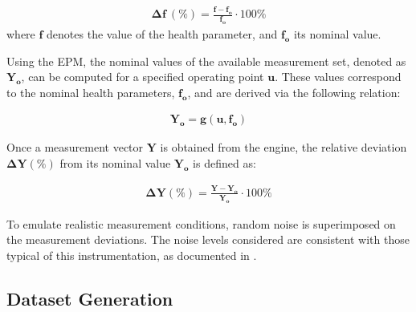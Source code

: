 \documentclass[twocolumn]{ceurart}
\begin{document}
\begin{eqnarray}\label{eq:deltaf}
    \mathbf{\Delta f}\ (\%) = \frac{\mathbf{f} - \mathbf{f_o}}{\mathbf{f_o}} \cdot 100\%
\end{eqnarray}
%
where $\mathbf{f}$ denotes the value of the health parameter, and $\mathbf{f_o}$ its nominal value.

Using the EPM, the nominal values of the available measurement set, denoted as $\mathbf{Y_o}$, 
can be computed for a specified operating point $\mathbf{u}$. These values correspond to the nominal health parameters, $\mathbf{f_o}$, and are derived via the following relation:

\begin{eqnarray}\label{eq:epmnom}
\mathbf{Y_o} = \mathbf{g}(\mathbf{u}, \mathbf{f_o})
\end{eqnarray}

Once a measurement vector $\mathbf{Y}$ is obtained from the engine, the relative deviation $\mathbf{\Delta Y(\%)}$
from its nominal value $\mathbf{Y_o}$ is defined as:

\begin{eqnarray}\label{eq:deltay}
    \mathbf{\Delta Y}(\%) = \frac{\mathbf{Y} - \mathbf{Y_o}}{\mathbf{Y_o}} \cdot 100\%
\end{eqnarray}

To emulate realistic measurement conditions, random noise is superimposed on the measurement 
deviations. The noise levels considered are consistent with those typical of this instrumentation, 
as documented in \citep{romesis_model-assisted_2024}.

\subsection{Dataset Generation}
\end{document}
